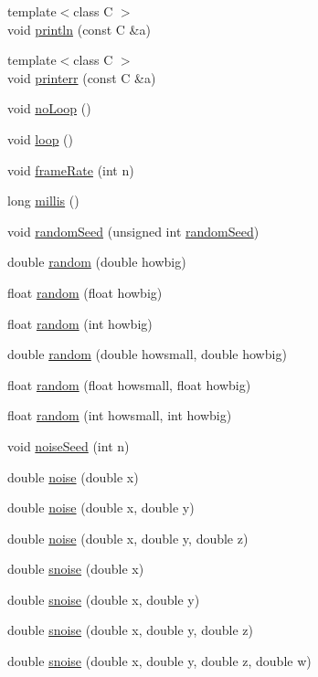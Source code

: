 \begin{DoxyCompactItemize}
{\footnotesize template$<$class C $>$ }\\void \hyperlink{namespacecprocessing_adb24a9653ec0c180336385d1c006a658}{println} (const \-C \&a)
\item 
{\footnotesize template$<$class C $>$ }\\void \hyperlink{namespacecprocessing_ab4318658947e0ca5be41534735735b9b}{printerr} (const \-C \&a)
\item 
void \hyperlink{namespacecprocessing_aec8195139a88226bc60d3eddaa5d65b9}{no\-Loop} ()
\item 
void \hyperlink{namespacecprocessing_a66554fc7a3370552f74c563d0c5adcef}{loop} ()
\item 
void \hyperlink{namespacecprocessing_a09d66ead6ff18c18aa353ee6ed50bb78}{frame\-Rate} (int n)
\item 
long \hyperlink{namespacecprocessing_ad302883a6ce30f331258927090bf924a}{millis} ()
\item 
void \hyperlink{namespacecprocessing_a71cb5d974435b9aff63bab3fd9e47b2c}{random\-Seed} (unsigned int \hyperlink{namespacecprocessing_a71cb5d974435b9aff63bab3fd9e47b2c}{random\-Seed})
\item 
double \hyperlink{namespacecprocessing_af80d5416f0be7b44024b66fdab375cf5}{random} (double howbig)
\item 
float \hyperlink{namespacecprocessing_a4254fb2e188dcbfc114392750df85469}{random} (float howbig)
\item 
float \hyperlink{namespacecprocessing_a874dc56fc0d6e65a1b13e40e2c88d367}{random} (int howbig)
\item 
double \hyperlink{namespacecprocessing_acbb34da5bbdcb90c835f747da782164a}{random} (double howsmall, double howbig)
\item 
float \hyperlink{namespacecprocessing_a4acf597a7eba6baff6bb2dfceb44e91b}{random} (float howsmall, float howbig)
\item 
float \hyperlink{namespacecprocessing_aff94df2ca686ab8cb8c29e06f06c41c8}{random} (int howsmall, int howbig)
\item 
void \hyperlink{namespacecprocessing_a018a4f19c47283bd51f6c0004bdbaa78}{noise\-Seed} (int n)
\item 
double \hyperlink{namespacecprocessing_a4289b302ccbd6bee448b7756854c7baf}{noise} (double x)
\item 
double \hyperlink{namespacecprocessing_a94c3501dd1ee3555f5af3884b11b8a04}{noise} (double x, double y)
\item 
double \hyperlink{namespacecprocessing_a12c5c480ee409902975902ee93e7f6f1}{noise} (double x, double y, double z)
\item 
double \hyperlink{namespacecprocessing_a4e17576d2a90714ee8674267ec110818}{snoise} (double x)
\item 
double \hyperlink{namespacecprocessing_a3e3ddf4e0b20ef72ba96024ba642ae82}{snoise} (double x, double y)
\item 
double \hyperlink{namespacecprocessing_a6e08520154ed9955742b56be9d67d2f8}{snoise} (double x, double y, double z)
\item 
double \hyperlink{namespacecprocessing_a1eff9b8a49a4447c4b7b9c8fe8b70cb0}{snoise} (double x, double y, double z, double w)
\end{DoxyCompactItemize}

